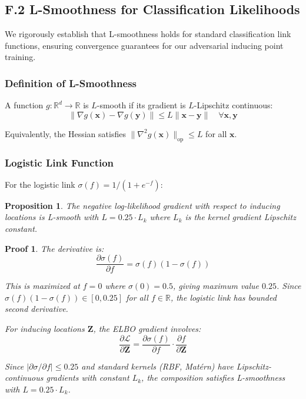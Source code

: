 \documentclass[12pt]{article}
\newcommand{\R}{\mathbb{R}}
\newtheorem{proposition}[theorem]{Proposition}
\newtheorem{proof_sketch}{Proof}
\begin{document}
\subsection{F.2 L-Smoothness for Classification Likelihoods}

We rigorously establish that L-smoothness holds for standard classification link functions, ensuring convergence guarantees for our adversarial inducing point training.

\subsubsection{Definition of L-Smoothness}

A function $g: \R^d \to \R$ is $L$-smooth if its gradient is $L$-Lipschitz continuous:
\begin{equation}
\|\nabla g(\mathbf{x}) - \nabla g(\mathbf{y})\| \leq L\|\mathbf{x} - \mathbf{y}\| \quad \forall \mathbf{x}, \mathbf{y}
\end{equation}

Equivalently, the Hessian satisfies $\|\nabla^2 g(\mathbf{x})\|_{\text{op}} \leq L$ for all $\mathbf{x}$.

\subsubsection{Logistic Link Function}

For the logistic link $\sigma(f) = 1/(1+e^{-f})$:

\begin{proposition}
The negative log-likelihood gradient with respect to inducing locations is L-smooth with $L = 0.25 \cdot L_k$ where $L_k$ is the kernel gradient Lipschitz constant.
\end{proposition}

\begin{proof_sketch}
The derivative is:
\begin{equation}
\frac{\partial \sigma(f)}{\partial f} = \sigma(f)(1-\sigma(f))
\end{equation}

This is maximized at $f=0$ where $\sigma(0) = 0.5$, giving maximum value $0.25$. Since $\sigma(f)(1-\sigma(f)) \in [0, 0.25]$ for all $f \in \R$, the logistic link has bounded second derivative.

For inducing locations $\mathbf{Z}$, the ELBO gradient involves:
\begin{equation}
\frac{\partial \mathcal{L}}{\partial \mathbf{Z}} = \frac{\partial \sigma(f)}{\partial f} \cdot \frac{\partial f}{\partial \mathbf{Z}}
\end{equation}

Since $|\partial\sigma/\partial f| \leq 0.25$ and standard kernels (RBF, Matérn) have Lipschitz-continuous gradients with constant $L_k$, the composition satisfies L-smoothness with $L = 0.25 \cdot L_k$.
\end{proof_sketch}
\end{document}

